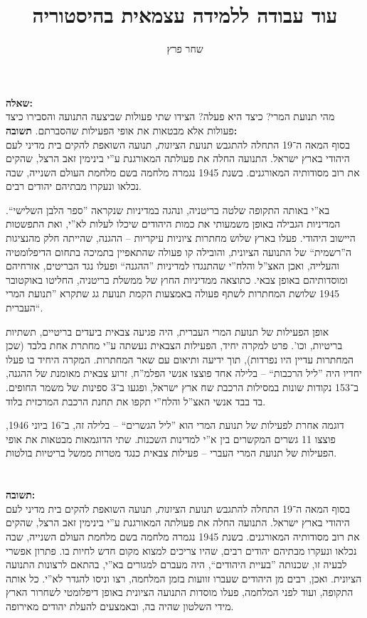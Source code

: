 \documentclass[]{../../../../tex/classes/homework}
\author{שחר פרץ}
\title{עוד עבודה ללמידה עצמאית בהיסטוריה}
\begin{document}
	\maketitle
	\section{}
	\textbf{שאלה: }\\
	מהי תנועת המרי? כיצד היא פעלה? הצידו שתי פעולות שביצעה התנועה והסבירו כיצד פעולות אלא מבטאות את אופי הפעילות שהסברתם. 
	\textbf{תשובה: }\\
	בסוף המאה ה־19 התחלה להתגבש תנועת ה\textit{ציונות}, תנועה השואפת להקים בית מדיני לעם היהודי בארץ ישראל. התנועה החלה את פעולתה המאורגנת ע''י בינימין זאב הרצל, שהקים את רוב מסודותיה המאורגנים. בשנת 1945 נגמרה מלחמה בשם מלחמת העולם השנייה, שבה נכלאו ונעקרו מבתיהם יהודים רבים. 
	
	בא''י באותה התקופה שלטה בריטניה, ונהגה במדיניות שנקראה ''ספר הלבן השלישי``. המדיניות הגבילה באופן משמעותי את כמות היהודים שיכלו לעלות לא''י, ואת התפשטות היישוב היהודי. פעלו בארץ שלוש מחתרות ציוניות עיקריות – ההגנה, שהייתה חלק מהנציגות ה''רשמית`` של התנועה הציונית, והובילה קו פעולה שהתאפיין בתמיכה בתחום הדיפלומטיה והעלייה, ואכן האצ''ל והלח''י שהתנגדו למדיניות ''ההגנה`` ופעלו נגד הבריטים, אזרחיהם ומוסדותיהם באופן צבאי. כתוצאה ממדיניות החוץ של ממשלת בריטניה, החליטו באוקטובר 1945 שלושת המחתרות לשתף פעולה באמצעות הקמת תנועת גג שתקרא ''תנועת המרי העברית``. 
	
	אופן הפעילות של תנועת המרי העברית, היה פגיעה צבאית ביעדים בריטיים, תשתיות בריטיות, וכו'. פרט למקרה יחיד, הפעילות הצבאית נעשתה ע''י מחתרת אחת בלבד (שכן המחתרות עדיין היו נפרדות), תוך ידיעה ותיאום עם שאר המחתרות. המקרה היחיד בו פעלו יחדיו היה ''ליל הרכבות`` – בלילה אחד פוצצו אנשי הפלמ''ח, זרוע צבאית מאומנת של ההגנה, ב־153 נקודות שונות במסילות הרכבת שח ארץ ישראל, ופגעו ב־3 ספינות של משמר החופים. בד בבד אנשי האצ''ל והלח''י תקפו את תחנת הרכבת המרכזית בלוד. 
	
	דוגמה אחרת לפעילות של תנועת המרי הוא ''ליל הגשרים`` – בלילה זה, ב־16 ביוני 1946, פוצצו 11 גשרים המקשרים בין א''י למדינות השכנות. שתי הדוגמאות מבטאות את אופי הפעילות של תנועת המרי העברי – פעילות צבאית כנגד מטרות ממשל בריטיות בולטות. 
	
	\section{}
	
	\textbf{תשובה: }\\
	בסוף המאה ה־19 התחלה להתגבש תנועת ה\textit{ציונות}, תנועה השואפת להקים בית מדיני לעם היהודי בארץ ישראל. התנועה החלה את פעולתה המאורגנת ע''י בינימין זאב הרצל, שהקים את רוב מסודותיה המאורגנים. בשנת 1945 נגמרה מלחמה בשם מלחמת העולם השנייה, שבה נכלאו ונעקרו מבתיהם יהודים רבים, שהיו צריכים למצוא מקום חדש לחיות בו. פתרון אפשרי לבעיה זו, שכנותה ''בעיית היהודים``, היה מעברם למגורים בא''י, בהתאם לרצונות התנועה הציונית. ואכן, רבים מן היהודים שעברו זוועות בזמן המלחמה, רצו וניסו להגדר לא''י. כל אותה התקופה, ועוד לפני המלחמה, פעלו מוסדות התנועה הציונית באופן דיפלומטי לשחרור הארץ מידי השלטון שהיה בה, ובאמצעים להעלת יהודים מאירופה. 
	
\end{document}
